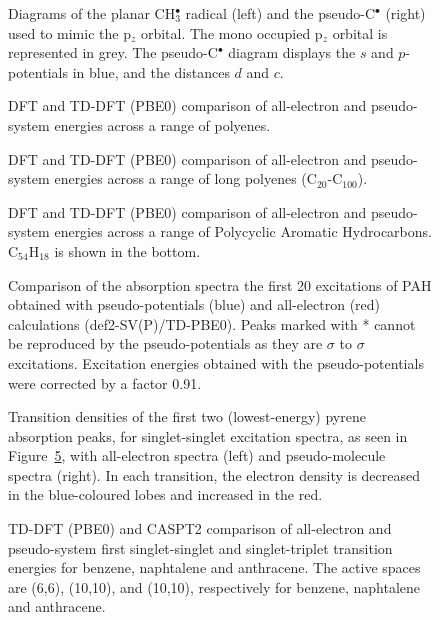 \documentclass[12pt]{article}
\begin{document}
\begin{figure}
\caption{Diagrams of the planar CH\(^{\bullet}_{3}\) radical (left) and the pseudo-C\(^{\bullet}\) (right)
used to mimic the p$_z$ orbital.
The mono occupied p$_z$ orbital is represented in grey.
The pseudo-C\(^{\bullet}\) diagram displays the \(s\) and \(p\)-potentials in blue,
and the distances \(d\) and \(c\).}
\label{figure:ref_pseudo_diagram}
\end{figure}

\begin{figure}
\caption{DFT and TD-DFT (PBE0) comparison of all-electron and pseudo-system energies across a range of
polyenes.}
\label{fig:alkenes_hf_dft}
\end{figure}

\begin{figure}
\caption{DFT and TD-DFT (PBE0) comparison of all-electron and pseudo-system energies across a range of long polyenes (C\(_{20}\)-C\(_{100}\)).}
\label{fig:long_chain_graphs}
\end{figure}

\begin{figure}
\caption{DFT and TD-DFT (PBE0) comparison of all-electron and pseudo-system energies across a range of Polycyclic Aromatic Hydrocarbons. 
C\(_{54}\)H\(_{18}\) is shown in the bottom.}
\label{fig:rings_graphs}
\end{figure}

\begin{figure}
\caption{Comparison of the absorption spectra the first 20 excitations of PAH obtained with
pseudo-potentials (blue) and all-electron (red) calculations (def2-SV(P)/TD-PBE0). Peaks marked
with * cannot be reproduced by the pseudo-potentials as they are $\sigma$ to $\sigma$ excitations.
Excitation energies obtained with the pseudo-potentials were corrected by a factor 0.91.}
\label{fig:cnhn_uv}
\end{figure}

\begin{figure}
\caption{Transition densities of the first two (lowest-energy) pyrene absorption peaks, for singlet-singlet excitation spectra, as seen in Figure~\ref{fig:cnhn_uv}, with all-electron spectra (left) and pseudo-molecule spectra (right). In each transition, the electron density is decreased in the blue-coloured lobes and increased in the red.}
\label{fig:transitiondensities}
\end{figure}

\begin{figure}
\caption{TD-DFT (PBE0) and CASPT2 comparison of all-electron and pseudo-system first singlet-singlet and
singlet-triplet transition energies for benzene, naphtalene and anthracene. The active spaces are 
(6,6), (10,10), and (10,10), respectively for benzene, naphtalene and anthracene.}
\label{fig:caspt2}
\end{figure}
\end{document}
